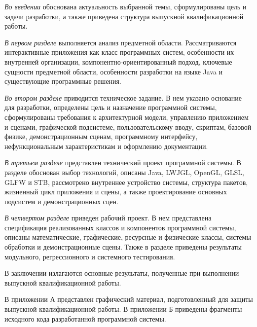 \emph{Во введении} обоснована актуальность выбранной темы, сформулированы цель и задачи разработки, а также приведена структура выпускной квалификационной работы.

\emph{В первом разделе} выполняется анализ предметной области. Рассматриваются интерактивные приложения как класс программных систем, особенности их внутренней организации, компонентно-ориентированный подход, ключевые сущности предметной области, особенности разработки на языке Java и существующие программные решения.

\emph{Во втором разделе} приводится техническое задание. В нем указано основание для разработки, определены цель и назначение программной системы, сформулированы требования к архитектурной модели, управлению приложением и сценами, графической подсистеме, пользовательскому вводу, скриптам, базовой физике, демонстрационным сценам, программному интерфейсу, нефункциональным характеристикам и оформлению документации.

\emph{В третьем разделе} представлен технический проект программной системы. В разделе обоснован выбор технологий, описаны Java, LWJGL, OpenGL, GLSL, GLFW и STB, рассмотрено внутреннее устройство системы, структура пакетов, жизненный цикл приложения и сцены, а также проектирование основных подсистем и демонстрационных сцен.

\emph{В четвертом разделе} приведен рабочий проект. В нем представлена спецификация реализованных классов и компонентов программной системы, описаны математические, графические, ресурсные и физические классы, системы обработки и демонстрационные сцены. Также в разделе приведены результаты модульного, регрессионного и системного тестирования.

В заключении излагаются основные результаты, полученные при выполнении выпускной квалификационной работы.

В приложении А представлен графический материал, подготовленный для защиты выпускной квалификационной работы. В приложении Б приведены фрагменты исходного кода разработанной программной системы.
